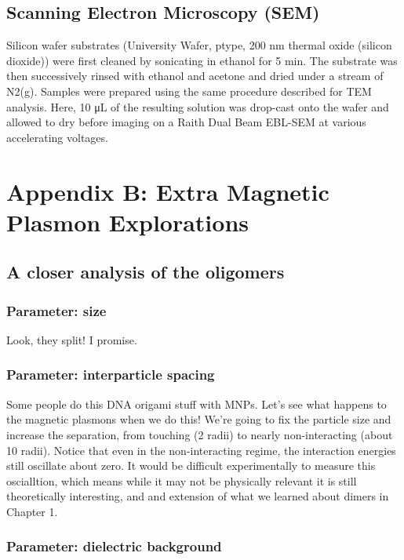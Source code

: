 \documentclass [11pt, proquest] {uwthesis}[2016/11/22]
\begin{document}
\section{Scanning Electron Microscopy (SEM)}

Silicon wafer substrates (University Wafer, ptype, 200 nm thermal oxide (silicon dioxide)) were first cleaned by sonicating in ethanol for 5 min. The substrate was then successively rinsed with ethanol and acetone and dried under a stream of N2(g). Samples were prepared using the same procedure described for TEM analysis. Here, 10 μL of the resulting solution was drop-cast onto the wafer and allowed to dry before imaging on a Raith Dual Beam EBL-SEM at various accelerating voltages.


\chapter{Appendix B: Extra Magnetic Plasmon Explorations}

\section{A closer analysis of the oligomers}

\subsection{Parameter: size}

Look, they split! I promise.

\subsection{Parameter: interparticle spacing}

Some people do this DNA origami stuff with MNPs. Let's see what happens to the magnetic plasmons when we do this! We're going to fix the particle size and increase the separation, from touching (2 radii) to nearly non-interacting (about 10 radii). Notice that even in the non-interacting regime, the interaction energies still oscillate about zero. It would be difficult experimentally to measure this oscialltion, which means while it may not be physically relevant it is still theoretically interesting, and and extension of what we learned about dimers in Chapter 1.

\subsection{Parameter: dielectric background}
\end{document}
